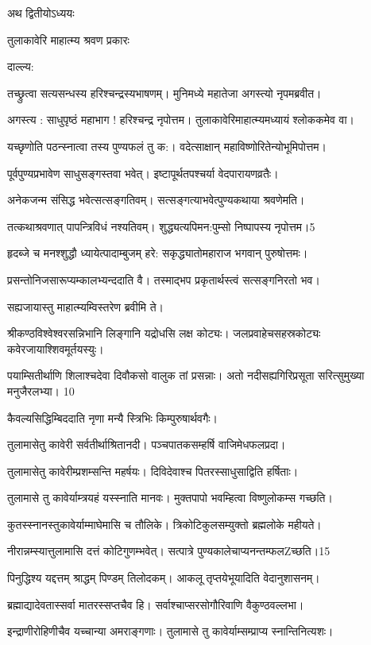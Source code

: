 अथ द्वितीयोऽध्ययः

तुलाकावेरि माहात्म्य श्रवण प्रकारः


दाल्ल्य:

तच्छ्रुत्वा सत्यसन्धस्य हरिश्चन्द्रस्यभाषणम्।
मुनिमध्ये महातेजा अगस्त्यो नृपमब्रवीत।

अगस्त्य : साधुपृष्ठं महाभाग ! हरिश्चन्द्र नृपोत्तम।
तुलाकावेरिमाहात्म्यमध्यायं श्लोककमेव वा।

यच्छृणोति पठन्स्नात्वा तस्य पुण्यफलं तु क:।
वदेत्साक्षान् महाविष्णोरितेन्योभूमिपोत्तम।

पूर्वपुण्यप्रभावेण साधुसङ्गस्तवा भवेत्।
इष्टापूर्थतपश्चर्या वेदपारायणव्रतैः।

अनेकजन्म संसिद्ध भवेत्सत्सङ्गतिवम्।
सत्सङ्गत्याभवेत्पुण्यकथाया श्रवणेमति।

तत्कथाश्रवणात् पापन्त्रिविधं नश्यतिवम्।
शुद्ध्यत्यपिमन:पुम्सो निष्पापस्य नृपोत्तम।5

हृदब्जे च मनश्शुद्धौ ध्यायेत्पादाम्बुजम् हरे:
सकृद्ध्यातोमहाराज भगवान् पुरुषोत्तमः।

प्रसन्तोनिजसारूप्यम्कालभ्यन्ददाति वै।
तस्माद्भप प्रकृतार्थस्त्वं सत्सङ्गनिरतो भव।

सह्यजायास्तु माहात्म्यम्विस्तरेण ब्रवीमि ते।

श्रीकण्ठविश्वेश्वरसन्निभानि
लिङ्गानि यद्रोधसि लक्ष कोट्यः।
जलप्रवाहेचसहस्रकोट्यः
कवेरजायाश्शिवमूर्तयस्युः।

पयाम्सितीर्थाणि शिलाश्चदेवा
दिवौकसो वालुक तां प्रसन्नाः।
अतो नदीसह्यगिरिप्रसूता
सरित्सुमुख्या मनुजैरलभ्या। 10

कैवल्यसिद्धिम्बिददाति नृणा
मन्यै स्त्रिभिः किम्पुरुषार्थवगैः।

तुलामासेतु कावेरी सर्वतीर्थाश्रितानदी।
पञ्चपातकसम्हर्षि वाजिमेधफलप्रदा।

तुलामासेतु कावेरीम्प्रशम्सन्ति महर्षयः।
दिविदेवाश्च पितरस्साधुसाद्विति हर्षिताः।

तुलामासे तु कावेर्याम्त्रयहं यस्स्नाति मानवः।
मुक्तपापो भवम्हित्वा विष्णुलोकम्स गच्छति।

कुतस्स्नानस्तुकावेर्याम्माघेमासि च तौलिके।
त्रिकोटिकुलसम्युक्तो ब्रह्मलोके महीयते।

नीरान्नम्स्यात्तुलामासि दत्तं कोटिगुणम्भवेत्।
सत्पात्रे पुण्यकालेचाप्यनन्तम्फलZच्छति।15

पिनुद्धिश्य यद्दत्तम् श्राद्धम् पिण्डम् तिलोदकम्।
आकलू तृप्तयेभूयादिति वेदानुशासनम्।

ब्रह्माद्यादेवतास्सर्वा मातरस्सप्तचैव हि।
सर्वाश्चाप्सरसोगौरिवाणि वैकुण्ठवल्लभा।

इन्द्राणीरोहिणीचैव यच्चान्या अमराङ्गणाः।
तुलामासे तु कावेर्याम्सम्प्राप्य स्नान्तिनित्यशः।

